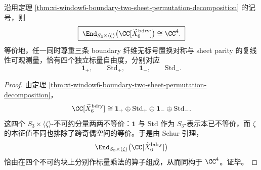 \begin{corollary}\label{cor:xi-window6-boundary-two-sheet-commutant-fourdimensional}
沿用定理 \ref{thm:xi-window6-boundary-two-sheet-permutation-decomposition} 的记号，则
\[
\boxed{\;
\End_{S_3\times \langle\zeta\rangle}
\bigl(\CC[\widetilde X_6^{\mathrm{bdry}}]\bigr)
\cong \CC^4.\;}
\]
等价地，任一同时尊重三条 boundary 纤维无标号置换对称与 sheet parity 的复线性可观测量，恰有四个独立标量自由度，分别对应
\[
\mathbf 1_{+},\qquad
\mathrm{Std}_{+},\qquad
\mathbf 1_{-},\qquad
\mathrm{Std}_{-}.
\]
\end{corollary}
\begin{proof}
由定理 \ref{thm:xi-window6-boundary-two-sheet-permutation-decomposition}，
\[
\CC[\widetilde X_6^{\mathrm{bdry}}]
\cong
\mathbf 1_{+}\oplus \mathrm{Std}_{+}\oplus \mathbf 1_{-}\oplus \mathrm{Std}_{-}.
\]
这四个 \(S_3\times \langle\zeta\rangle\)-不可约分量两两不等价：\(\mathbf 1\) 与 \(\mathrm{Std}\) 作为 \(S_3\)-表示本已不等价，而 \(\zeta\) 的本征值不同也排除了跨奇偶空间的等价。于是由 Schur 引理，
\[
\End_{S_3\times \langle\zeta\rangle}
\bigl(\CC[\widetilde X_6^{\mathrm{bdry}}]\bigr)
\]
恰由在四个不可约块上分别作标量乘法的算子组成，从而同构于 \(\CC^4\)。证毕。
\end{proof}

